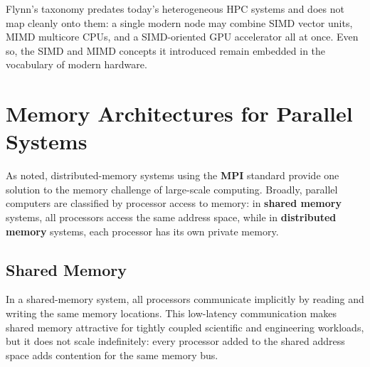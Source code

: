 Flynn's taxonomy predates today's heterogeneous HPC systems and does not map cleanly onto them: a single modern node may combine SIMD vector units, MIMD multicore CPUs, and a SIMD-oriented GPU accelerator all at once. Even so, the SIMD and MIMD concepts it introduced remain embedded in the vocabulary of modern hardware.

\section{Memory Architectures for Parallel Systems} \label{sec:memory_architectures}

As noted, distributed-memory systems using the \textbf{MPI} standard provide one solution to the memory challenge of large-scale computing. Broadly, parallel computers are classified by processor access to memory: in \textbf{shared memory} systems, all processors access the same address space, while in \textbf{distributed memory} systems, each processor has its own private memory.

\subsection{Shared Memory}

In a shared-memory system, all processors communicate implicitly by reading and writing the same memory locations. This low-latency communication makes shared memory attractive for tightly coupled scientific and engineering workloads, but it does not scale indefinitely: every processor added to the shared address space adds contention for the same memory bus.

